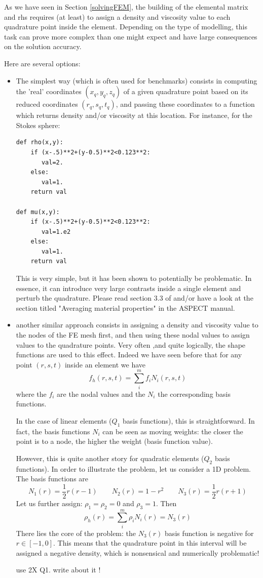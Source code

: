 
As we have seen in Section \ref{solvingFEM}, the building of the elemental matrix and rhs
requires (at least) to assign a density and viscosity value to each quadrature point inside
the element. Depending on the type of modelling, this task can prove more complex than 
one might expect and have large consequences on the solution accuracy.

Here are several options:

\begin{itemize}
\item The simplest way (which is often used for benchmarks) consists in computing the 'real'
coordinates $(x_q,y_q,z_q)$ of a given quadrature point based on its reduced coordinates 
$(r_q,s_q,t_q)$, and passing these coordinates to a function which returns density and/or viscosity
at this location. For instance, for the Stokes sphere:
\begin{verbatim}
def rho(x,y):
    if (x-.5)**2+(y-0.5)**2<0.123**2:
       val=2.
    else:
       val=1.
    return val

def mu(x,y):
    if (x-.5)**2+(y-0.5)**2<0.123**2:
       val=1.e2
    else:
       val=1.
    return val
\end{verbatim}
This is very simple, but it has been shown to potentially be problematic. In essence, it can introduce very large contrasts inside a single element and perturb the quadrature. Please read section 3.3 of \cite{hedg17} and/or
have a look at the section titled "Averaging material properties" in the ASPECT manual.

\item another similar approach consists in assigning a density and viscosity value to the nodes of the FE mesh first, and then using these nodal values to assign values to the quadrature points. Very often ,and quite logically, the shape functions are used to this effect. Indeed we have seen before that for any point $(r,s,t)$ inside an element we have
\[
f_h(r,s,t) = \sum_{i}^m f_i N_i(r,s,t)
\]  
where the $f_i$ are the nodal values and the $N_i$ the corresponding basis functions. 

In the case of linear elements ($Q_1$ basis functions), this is straightforward. In fact, the basis functions $N_i$ can be seen as moving weights: the closer the point is to a node, the higher the weight (basis function value). 

However, this is quite another story for quadratic elements ($Q_2$ basis functions). In order to illustrate the 
problem, let us consider a 1D problem. The basis functions are 
\[
N_1(r) =\frac{1}{2}r(r-1)
\quad\quad
N_2(r)=1-r^2
\quad\quad
N_3(r) =\frac{1}{2}r(r+1)
\]
Let us further assign: $\rho_1=\rho_2=0$ and $\rho_3=1$. Then 
\[
\rho_h(r) = \sum_{i}^m \rho_i N_i(r) = N_3(r)
\]  
There lies the core of the problem: the $N_3(r)$ basis function is negative for $r\in[-1,0]$. This means that the quadrature point in this interval will be assigned a negative density, which is nonsensical and numerically problematic!

{\color{red} use 2X Q1. write about it !}

\end{itemize}

